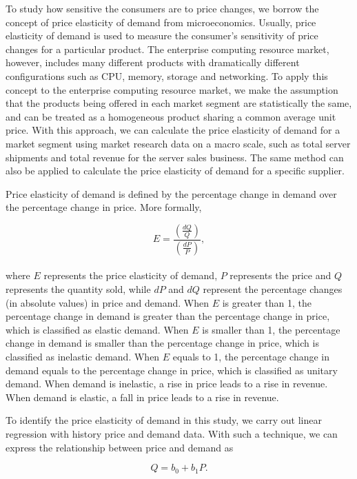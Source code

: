 \documentclass[10pt,journal,cspaper,compsoc]{IEEEtran}
\begin{document}
To study how sensitive the consumers are to price changes, we borrow the concept of price elasticity of demand from microeconomics. Usually, price elasticity of demand is used to measure the consumer's sensitivity of price changes for a particular product. The enterprise computing resource market, however, includes many different products with dramatically different configurations such as CPU, memory, storage and networking. To apply this concept to the enterprise computing resource market, we make the assumption that the products being offered in each market segment are statistically the same, and can be treated as a homogeneous product sharing a common average unit price. With this approach, we can calculate the price elasticity of demand for a market segment using market research data on a macro scale, such as total server shipments and total revenue for the server sales business. The same method can also be applied to calculate the price elasticity of demand for a specific supplier.

Price elasticity of demand is defined by the percentage change in demand over the percentage change in price. More formally,

\begin{equation}
E = \frac{\left ( \frac{dQ}{Q} \right )}{\left ( \frac{dP}{P} \right )} ,
\end{equation}
\\where $E$ represents the price elasticity of demand, $P$ represents the price and $Q$ represents the quantity sold, while $dP$ and $dQ$ represent the percentage changes (in absolute values) in price and demand. When $E$ is greater than 1, the percentage change in demand is greater than the percentage change in price, which is classified as elastic demand. When $E$ is smaller than 1, the percentage change in demand is smaller than the percentage change in price, which is classified as inelastic demand. When $E$ equals to 1, the percentage change in demand equals to the percentage change in price, which is classified as unitary demand. When demand is inelastic, a rise in price leads to a rise in revenue. When demand is elastic, a fall in price leads to a rise in revenue. 

To identify the price elasticity of demand in this study, we carry out linear regression with history price and demand data. With such a technique, we can express the relationship between price and demand as

\begin{equation}
Q = b_0 + b_1 P .
\end{equation}
\end{document}
